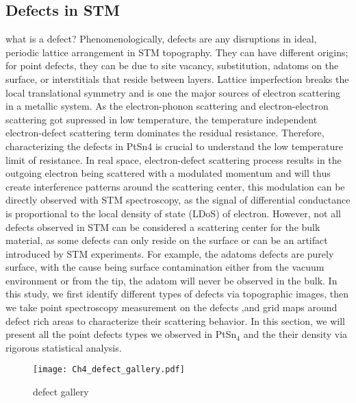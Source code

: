 \subsection{Defects in STM}
what is a defect?
Phenomenologically, defects are any disruptions in ideal, periodic lattice arrangement in STM topography. They can have different origins; for point defects, they can be due to site vacancy, substitution, adatoms on the surface, or interstitials that reside between layers.
Lattice imperfection breaks the local translational symmetry and is one the major sources of electron scattering in a metallic system. As the electron-phonon scattering and electron-electron scattering got supressed in low temperature, the temperature independent electron-defect scattering term dominates the residual resistance. Therefore, characterizing the defects in PtSn4 is crucial to understand the low temperature limit of resistance. In real space, electron-defect scattering process results in the outgoing electron being scattered with a modulated momentum and will thus create interference patterns around the scattering center, this modulation can be directly observed with STM spectroscopy, as the signal of differential conductance is proportional to the local density of state (LDoS) of electron. 
However, not all defects observed in STM can be considered a scattering center for the bulk material, as some defects can only reside on the surface or can be an artifact introduced by STM experiments.  For example, the adatoms defects are purely surface, with the cause being surface contamination either from the vacuum environment or from the tip, the adatom will never be observed in the bulk. 
In this study, we first identify different types of defects via topographic images, then we take point spectroscopy measurement on the defects ,and grid maps around defect rich areas to characterize their scattering behavior. In this section, we will present all the point defects types we observed in PtSn$_4$ and the their density via rigorous statistical analysis. 

\begin{figure}
	\centering
	\texttt{[image: Ch4\_defect\_gallery.pdf]}
	\caption{defect gallery}
	\label{fig:ch4_defectgallery}
\end{figure}

